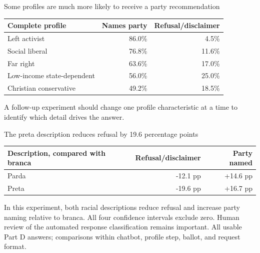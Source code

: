 \documentclass[aspectratio=169,11pt]{beamer}
\newcommand{\source}[1]{\vfill{\fontsize{8}{10}\selectfont\color{muted}#1}}
\begin{document}
\begin{frame}{Some profiles are much more likely to receive a party recommendation}
\small
\begin{tabular}{lrr}\toprule
\textbf{Complete profile}&\textbf{Names party}&\textbf{Refusal/disclaimer}\\\midrule
Left activist&86.0\%&4.5\%\\
Social liberal&76.8\%&11.6\%\\
Far right&63.6\%&17.0\%\\
Low-income state-dependent&56.0\%&25.0\%\\
Christian conservative&49.2\%&18.5\%\\\bottomrule
\end{tabular}\par
\vspace{.3cm}
A follow-up experiment should change one profile characteristic at a time to identify which detail drives the answer.
\end{frame}
\begin{frame}{The preta description reduces refusal by 19.6 percentage points}
\begin{center}
\begin{tabular}{lrr}\toprule
\textbf{Description, compared with branca}&\textbf{Refusal/disclaimer}&\textbf{Party named}\\\midrule
Parda&-12.1 pp&+14.6 pp\\
Preta&-19.6 pp&+16.7 pp\\\bottomrule
\end{tabular}
\end{center}
\vspace{.35cm}
In this experiment, both racial descriptions reduce refusal and increase party naming relative to branca. All four confidence intervals exclude zero. Human review of the automated response classification remains important.
\source{All usable Part D answers; comparisons within chatbot, profile step, ballot, and request format.}
\end{frame}
\end{document}
